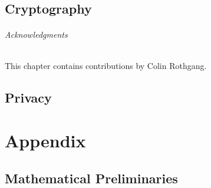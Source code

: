 \documentclass{book}
\begin{document}
  \chapter{Cryptography}

  \paragraph{Acknowledgments}
  This chapter contains contributions by Colin Rothgang.
  
    


  \chapter{Privacy}

%
%  

\part{Appendix}

\appendix

\chapter{Mathematical Preliminaries}\label{sec:math}


\tocentryBib


%
%
\end{document}

